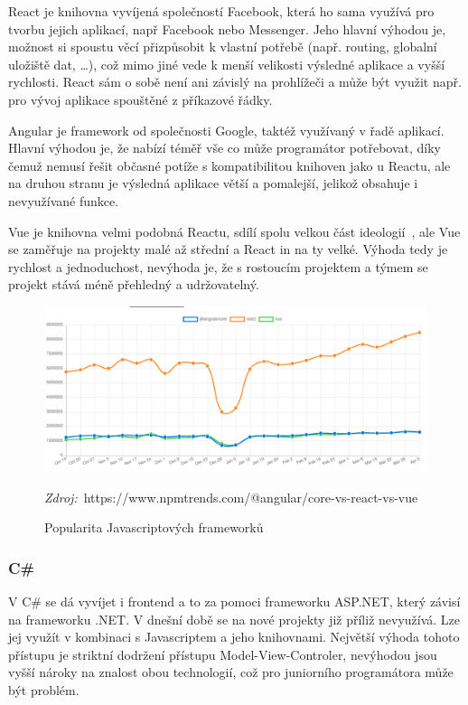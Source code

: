 React je knihovna vyvíjená společností Facebook, která ho sama využívá pro tvorbu jejich aplikací, např Facebook nebo Messenger. Jeho hlavní výhodou je, možnost si spoustu věcí přizpůsobit k vlastní potřebě (např. routing, globalní uložiště dat, \ldots{}), což mimo jiné vede k menší velikosti výsledné aplikace a vyšší rychlosti. React sám o sobě není ani závislý na prohlížeči a může být využit např. pro vývoj aplikace spouštěné z příkazové řádky.

Angular je framework od společnosti Google, taktéž využívaný v řadě aplikací. Hlavní výhodou je, že nabízí téměř vše co může programátor potřebovat, díky čemuž nemusí řešit občasné potíže s kompatibilitou knihoven jako u Reactu, ale na druhou stranu je výsledná aplikace větší a pomalejší, jelikož obsahuje i nevyužívané funkce.

Vue je knihovna velmi podobná Reactu, sdílí spolu velkou část ideologií~\cite{you_2014_comparison}, ale Vue se zaměřuje na projekty malé až střední a React in na ty velké. Výhoda tedy je rychlost a jednoduchost, nevýhoda je, že s rostoucím projektem a týmem se projekt stává méně přehledný a udržovatelný.

\begin{figure}[h!]
    \centering
    \includegraphics[width=\textwidth]{assets/popularity_plot.png}
    \caption*{\textit{Zdroj:}~https://www.npmtrends.com/@angular/core-vs-react-vs-vue}
    \caption{Popularita Javascriptových frameworků}
    \label{fig:popularity_plot}
\end{figure}

\subsubsection*{C\# }
V C\# se dá vyvíjet i frontend a to za pomoci frameworku ASP.NET, který závisí na frameworku .NET. V dnešní době se na nové projekty již příliž nevyužívá. Lze jej využít v kombinaci s Javascriptem a jeho knihovnami. Největší výhoda tohoto přístupu je striktní dodržení přístupu Model-View-Controler, nevýhodou jsou vyšší nároky na znalost obou technologií, což pro juniorního programátora může být problém.

